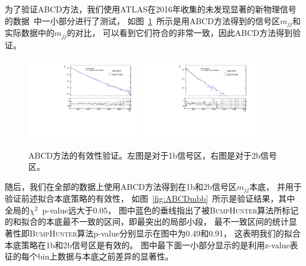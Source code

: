 为了验证ABCD方法，我们使用ATLAS在2016年收集的未发现显著的新物理信号的数据~\cite{ATLASDijet8,ATLASDijet9}中一小部分进行了测试，
如图~\ref{fig:validationABCD}~所示是用ABCD方法得到的信号区$m_{jj}$和实际数据中的$m_{jj}$的对比，
可以看到它们符合的非常一致，因此ABCD方法得到验证。

\begin{figure}[!ht]
	\centering
	\includegraphics[width=0.45\textwidth]{figuresDijet/04-BackgroundEstimation/1tag_validationABCD.pdf}
	\includegraphics[width=0.45\textwidth]{figuresDijet/04-BackgroundEstimation/2tag_validationABCD.pdf}
	\caption{ABCD方法的有效性验证。左图是对于1b信号区，右图是对于2b信号区。}
	\label{fig:validationABCD}
\end{figure}


随后，我们在全部的数据上使用ABCD方法得到在1b和2b信号区$m_{jj}$本底，
并用于验证前述拟合本底策略的有效性，
如图~\ref{fig:ABCDmbb}~所示是验证结果，其中全局的$\chi^2$~p-value远大于0.05，
图中蓝色的垂线指出了被\textsc{BumpHunter}算法所标记的和拟合的本底最不一致的区间，即最突出的局部小段，
最不一致区间的统计显著性即\textsc{BumpHunter}算法p-value分别显示在图中为0.49和0.91，
这表明我们的拟合本底策略在1b和2b信号区是有效的。
图中最下面一小部分显示的是利用z-value表征的每个bin上数据与本底之前差异的显著性。

